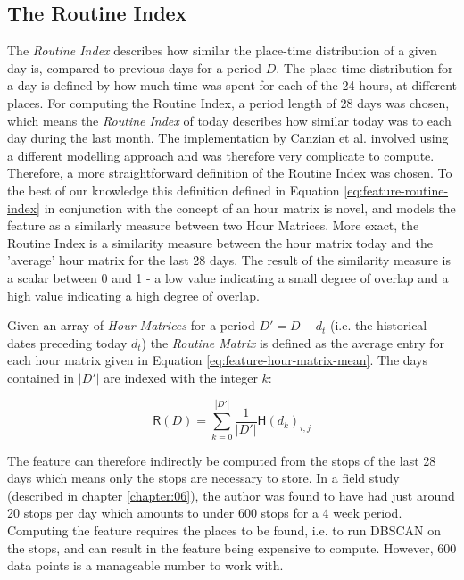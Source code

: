 \subsection{The Routine Index}
\label{sub:routine-index}
The \textit{Routine Index} describes how similar the place-time distribution of a given day is, compared to previous days for a period $D$. The place-time distribution for a day is defined by how much time was spent for each of the 24 hours, at different places. For computing the Routine Index, a period length of 28 days was chosen, which means the \textit{Routine Index} of today describes how similar today was to each day during the last month. The implementation by Canzian et al. \cite{Canzian2015} involved using a different modelling approach and was therefore very complicate to compute.  Therefore, a more straightforward definition of the Routine Index was chosen. To the best of our knowledge this definition defined in Equation \eqref{eq:feature-routine-index} in conjunction with the concept of an hour matrix is novel, and models the feature as a similarly measure between two Hour Matrices. More exact, the Routine Index is a similarity measure between the hour matrix today and the 'average' hour matrix for the last 28 days. The result of the similarity measure is a scalar between 0 and 1 - a low value indicating a small degree of overlap and a high value indicating a high degree of overlap. 

Given an array of \textit{Hour Matrices} for a period $D' = D - d_t$ (i.e. the historical dates preceding today $d_t$) the \textit{Routine Matrix} is defined as the average entry for each hour matrix given in Equation \eqref{eq:feature-hour-matrix-mean}. The days contained in $|D'|$ are indexed with the integer $k$:

\begin{equation}
\label{eq:feature-hour-matrix-mean}
\mathsf{R}(D) = \sum_{k=0}^{|D'|} \frac{1}{|D'|} \mathsf{H}(d_{k})_{i,j}
\end{equation}

The feature can therefore indirectly be computed from the stops of the last 28 days which means only the stops are necessary to store. In a field study (described in chapter \ref{chapter:06}), the author was found to have had just around 20 stops per day which amounts to under 600 stops for a 4 week period. Computing the feature requires the places to be found, i.e. to run DBSCAN on the stops, and can result in the feature being expensive to compute. However, 600 data points is a manageable number to work with.

